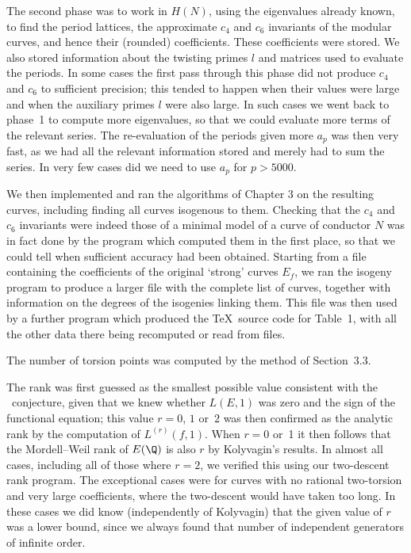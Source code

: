The second phase was to work in $H(N)$, using the eigenvalues already
known, to find the period lattices, the approximate $c_4$ and $c_6$
invariants of the modular curves, and hence their (rounded)
coefficients.  These coefficients were stored.  We also stored
information about the twisting primes $l$ and matrices used to
evaluate the periods.  In some cases the first pass through this phase
did not produce $c_4$ and $c_6$ to sufficient precision; this tended
to happen when their values were large and when the auxiliary primes
$l$ were also large.  In such cases we went back to phase~1 to compute
more eigenvalues, so that we could evaluate more terms of the relevant
series.  The re-evaluation of the periods given more $a_p$ was then
very fast, as we had all the relevant information stored and merely
had to sum the series. In very few cases did we need to use $a_p$ for
$p>5000$.

We then implemented and ran the algorithms of Chapter 3 on the
resulting curves, including finding all curves isogenous to
them. Checking that the $c_4$ and $c_6$ invariants were indeed those
of a minimal model of a curve of conductor $N$ was in fact done by the
program which computed them in the first place, so that we could tell
when sufficient accuracy had been obtained.  Starting from a file
containing the coefficients of the original `strong' curves $E_f$, we
ran the isogeny program to produce a larger file with the complete
list of curves, together with information on the degrees of the
isogenies linking them. This file was then used by a further program
which produced the \TeX\ source code for Table~1, with all the other
data there being recomputed or read from files.

The number of torsion points was computed by the method of Section~3.3.  

The rank was first guessed as the smallest possible value consistent
with the \BSD\ conjecture, given that we knew whether $L(E,1)$ was
zero and the sign of the functional equation; this value $r=0$, $1$
or~$2$ was then confirmed as the analytic rank by the computation of
$L^{(r)}(f,1)$.  When $r=0$ or~1 it then follows that the
Mordell--Weil rank of $E(\Q)$ is also $r$ by Kolyvagin's results.  In
almost all cases, including all of those where $r=2$, we verified this
using our two-descent rank program.  The exceptional cases were for
curves with no rational two-torsion and very large coefficients, where
the two-descent would have taken too long.  In these cases we did know
(independently of Kolyvagin) that the given value of $r$ was a
lower bound, since we always found that number of independent
generators of infinite order.

